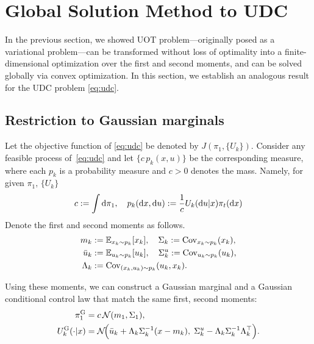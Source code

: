 \documentclass{ifacconf}
\newcommand{\rmd}{{\rm d}}
\newcommand{\calN}{{\mathcal N}}
\newcommand{\bbE}{{\mathbb E}}
\begin{document}
\section{Global Solution Method to UDC}
\label{section:udc_solution}

In the previous section, we showed UOT problem---originally posed as a variational problem---can be transformed without loss of optimality into a finite-dimensional optimization over the first and second moments, and can be solved globally via convex optimization.
In this section, we establish an analogous result for the UDC problem \eqref{eq:udc}. 

\subsection{Restriction to Gaussian marginals}
\label{subsection:gaussian_affine_reduction}

Let the objective function of \eqref{eq:udc} be denoted by $J(\pi_1,\{U_k\})$.
Consider any feasible process of~\eqref{eq:udc} and let  $\{c\,p_k(x,u)\}$ be the corresponding measure, where each $p_k$ is a probability measure and $c>0$ denotes the mass. Namely, for given \(\pi_1,\,\{U_k\}\)
\begin{align*}
    c:= \int \rmd\pi_1,\quad
    p_k(\rmd x,\rmd u):= \frac{1}{c}U_k(\rmd u|x)\pi_t(\rmd x)
\end{align*}
Denote the first and second moments as follows.
\begin{align}\label{eq:moments_def}
    m_k &:= \bbE_{x_k\sim p_k}[x_k], \quad\Sigma_k := {\rm Cov}_{x_k\sim p_k}(x_k), \nonumber\\
    \bar u_k &:= \bbE_{u_k\sim p_k}[u_k], \quad \Sigma^u_k := {\rm Cov}_{u_k\sim p_k}(u_k),  \nonumber\\
    \Lambda_k &:= {\rm Cov}_{(x_k,u_k)\sim p_k}(u_k,x_k).
\end{align}


Using these moments, we can construct a Gaussian marginal and a Gaussian conditional control law that match the same first, second moments:
\begin{align}\label{eq:gaussian_affine_policy}
    \pi_1^{\rm G} &= c\,\calN(m_1,\Sigma_1), \nonumber\\
    U_k^{\rm G}(\cdot | x) &= \calN\!\Bigl(\bar u_k + \Lambda_k \Sigma_k^{-1}(x-m_k),\; \Sigma^u_k - \Lambda_k \Sigma_k^{-1}\Lambda_k^\top\Bigr).
\end{align}
\end{document}
